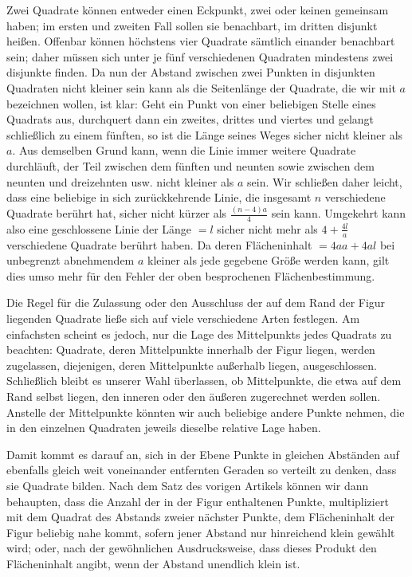 Zwei Quadrate können entweder einen Eckpunkt, zwei oder keinen gemeinsam haben; im ersten und zweiten Fall sollen sie benachbart, im dritten disjunkt heißen. Offenbar können höchstens vier Quadrate sämtlich einander benachbart sein; daher müssen sich unter je fünf verschiedenen Quadraten mindestens zwei disjunkte finden. Da nun der Abstand zwischen zwei Punkten in disjunkten Quadraten nicht kleiner sein kann als die Seitenlänge der Quadrate, die wir mit $a$ bezeichnen wollen, ist klar: Geht ein Punkt von einer beliebigen Stelle eines Quadrats aus, durchquert dann ein zweites, drittes und viertes und gelangt schließlich zu einem fünften, so ist die Länge seines Weges sicher nicht kleiner als $a$. Aus demselben Grund kann, wenn die Linie immer weitere Quadrate durchläuft, der Teil zwischen dem fünften und neunten sowie zwischen dem neunten und dreizehnten usw. nicht kleiner als $a$ sein. Wir schließen daher leicht, dass eine beliebige in sich zurückkehrende Linie, die insgesamt $n$ verschiedene Quadrate berührt hat, sicher nicht kürzer als $\frac{(n-4)a}4$ sein kann. Umgekehrt kann also eine geschlossene Linie der Länge $=l$ sicher nicht mehr als $4+\frac{4l}a$ verschiedene Quadrate berührt haben. Da deren Flächeninhalt $=4aa+4al$ bei unbegrenzt abnehmendem $a$ kleiner als jede gegebene Größe werden kann, gilt dies umso mehr für den Fehler der oben besprochenen Flächenbestimmung.

Die Regel für die Zulassung oder den Ausschluss der auf dem Rand der Figur liegenden Quadrate ließe sich auf viele verschiedene Arten festlegen. Am einfachsten scheint es jedoch, nur die Lage des Mittelpunkts jedes Quadrats zu beachten: Quadrate, deren Mittelpunkte innerhalb der Figur liegen, werden zugelassen, diejenigen, deren Mittelpunkte außerhalb liegen, ausgeschlossen. Schließlich bleibt es unserer Wahl überlassen, ob Mittelpunkte, die etwa auf dem Rand selbst liegen, den inneren oder den äußeren zugerechnet werden sollen. Anstelle der Mittelpunkte könnten wir auch beliebige andere Punkte nehmen, die in den einzelnen Quadraten jeweils dieselbe relative Lage haben.

Damit kommt es darauf an, sich in der Ebene Punkte in gleichen Abständen auf ebenfalls gleich weit voneinander entfernten Geraden so verteilt zu denken, dass sie Quadrate bilden. Nach dem Satz des vorigen Artikels können wir dann behaupten, dass die Anzahl der in der Figur enthaltenen Punkte, multipliziert mit dem Quadrat des Abstands zweier nächster Punkte, dem Flächeninhalt der Figur beliebig nahe kommt, sofern jener Abstand nur hinreichend klein gewählt wird; oder, nach der gewöhnlichen Ausdrucksweise, dass dieses Produkt den Flächeninhalt angibt, wenn der Abstand unendlich klein ist.

